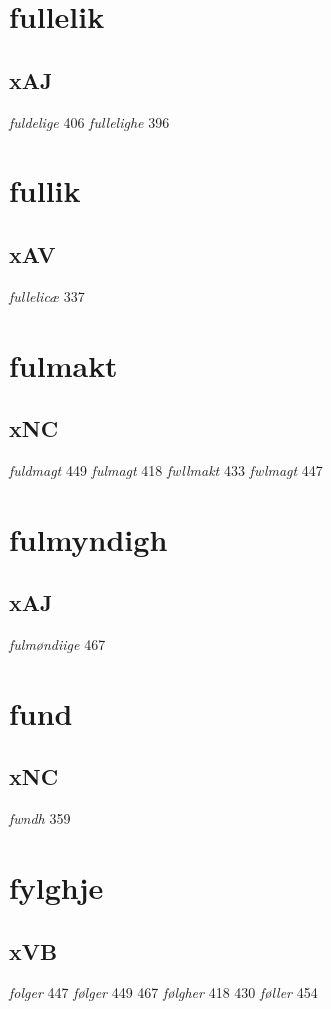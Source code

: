 \documentclass[a4paper,twocolumn]{article}
\begin{document}
\section{fullelik}
\label{sec:orgd701430}
\subsection{xAJ}
\label{sec:org29a6f5f}
\emph{fuldelige} 406 \emph{fullelighe} 396 
\section{fullik}
\label{sec:org421d5bb}
\subsection{xAV}
\label{sec:orgeed247d}
\emph{fullelicæ} 337 
\section{fulmakt}
\label{sec:org9169c51}
\subsection{xNC}
\label{sec:orga58f59f}
\emph{fuldmagt} 449 \emph{fulmagt} 418 \emph{fwllmakt} 433 \emph{fwlmagt} 447 
\section{fulmyndigh}
\label{sec:org9d73d54}
\subsection{xAJ}
\label{sec:orgd9df384}
\emph{fulmøndiige} 467 
\section{fund}
\label{sec:orgdbfa61e}
\subsection{xNC}
\label{sec:org394c9d7}
\emph{fwndh} 359 
\section{fylghje}
\label{sec:orgfac107f}
\subsection{xVB}
\label{sec:orgf612d4b}
\emph{folger} 447 \emph{følger} 449 467 \emph{følgher} 418 430 \emph{føller} 454 
\end{document}
